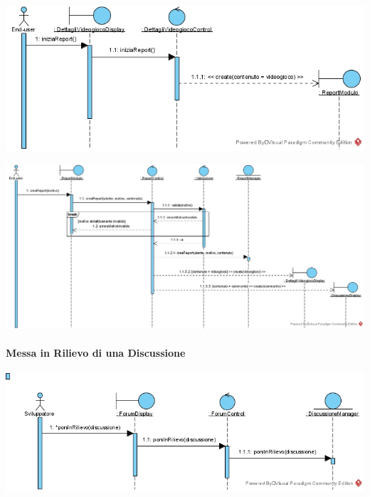 \begin{center}
\includegraphics[width=\textwidth,height=\textheight,keepaspectratio]{Figure/SequenceDiagrams/ReportContenutoOffensivoVideogioco.jpg}
\end{center}

\newpage
\begin{center}
\includegraphics[width=\textwidth,height=\textheight,keepaspectratio]{Figure/SequenceDiagrams/ReportContenutoOffensivoInnerXX.jpg}
\end{center}

\paragraph{Messa in Rilievo di una Discussione}
\begin{center}
\includegraphics[width=\textwidth,height=\textheight,keepaspectratio]{Figure/SequenceDiagrams/MessaRilievoDiscussione.jpg}
\end{center}

